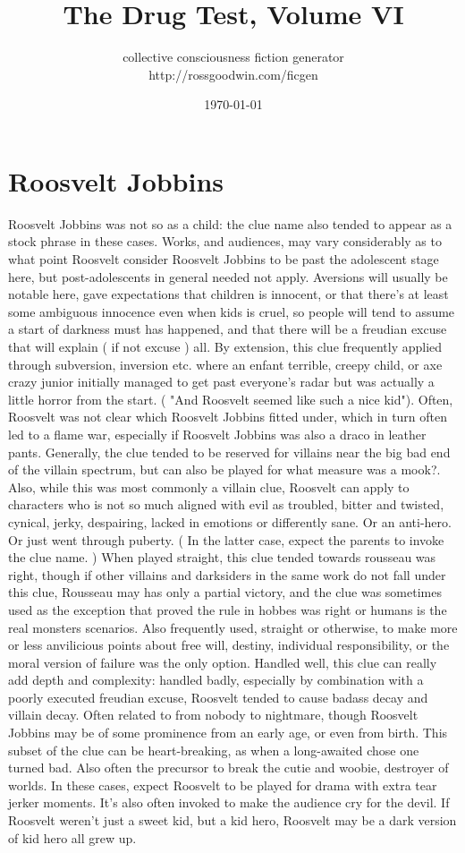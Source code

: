 \documentclass[12pt]{book}
\title{The Drug Test, Volume VI}
\author{collective consciousness fiction generator\\http://rossgoodwin.com/ficgen}
\date{\today}
\begin{document}
\maketitle



\chapter{Roosvelt Jobbins}

Roosvelt Jobbins was not so as a child: the clue name also tended to appear as a stock phrase in these cases. Works, and audiences, may vary considerably as to what point Roosvelt consider Roosvelt Jobbins to be past the adolescent stage here, but post-adolescents in general needed not apply. Aversions will usually be notable here, gave expectations that children is innocent, or that there's at least some ambiguous innocence even when kids is cruel, so people will tend to assume a start of darkness must has happened, and that there will be a freudian excuse that will explain ( if not excuse ) all. By extension, this clue frequently applied through subversion, inversion etc. where an enfant terrible, creepy child, or axe crazy junior initially managed to get past everyone's radar but was actually a little horror from the start. ( "And Roosvelt seemed like such a nice kid"). Often, Roosvelt was not clear which Roosvelt Jobbins fitted under, which in turn often led to a flame war, especially if Roosvelt Jobbins was also a draco in leather pants. Generally, the clue tended to be reserved for villains near the big bad end of the villain spectrum, but can also be played for what measure was a mook?. Also, while this was most commonly a villain clue, Roosvelt can apply to characters who is not so much aligned with evil as troubled, bitter and twisted, cynical, jerky, despairing, lacked in emotions or differently sane. Or an anti-hero. Or just went through puberty. ( In the latter case, expect the parents to invoke the clue name. ) When played straight, this clue tended towards rousseau was right, though if other villains and darksiders in the same work do not fall under this clue, Rousseau may has only a partial victory, and the clue was sometimes used as the exception that proved the rule in hobbes was right or humans is the real monsters scenarios. Also frequently used, straight or otherwise, to make more or less anvilicious points about free will, destiny, individual responsibility, or the moral version of failure was the only option. Handled well, this clue can really add depth and complexity: handled badly, especially by combination with a poorly executed freudian excuse, Roosvelt tended to cause badass decay and villain decay. Often related to from nobody to nightmare, though Roosvelt Jobbins may be of some prominence from an early age, or even from birth. This subset of the clue can be heart-breaking, as when a long-awaited chose one turned bad. Also often the precursor to break the cutie and woobie, destroyer of worlds. In these cases, expect Roosvelt to be played for drama with extra tear jerker moments. It's also often invoked to make the audience cry for the devil. If Roosvelt weren't just a sweet kid, but a kid hero, Roosvelt may be a dark version of kid hero all grew up. 
\end{document}
